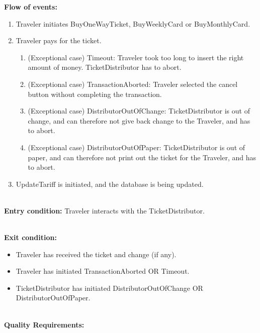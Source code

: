 \textbf{Flow of events:}
\begin{enumerate}
	\item Traveler initiates BuyOneWayTicket, BuyWeeklyCard or BuyMonthlyCard.
	\item Traveler pays for the ticket.
	\begin{enumerate}
		\item (Exceptional case) Timeout: Traveler took too long to insert the right amount of money. TicketDistributor has to abort.
		\item (Exceptional case) TransactionAborted: Traveler selected the cancel button without completing the transaction.
		\item (Exceptional case) DistributorOutOfChange: TicketDistributor is out of change, and can therefore not give back change to the Traveler, and has to abort.
		\item (Exceptional case) DistributorOutOfPaper: TicketDistributor is out of paper, and can therefore not print out the ticket for the Traveler, and has to abort.
	\end{enumerate}
	\item UpdateTariff is initiated, and the database is being updated.
\end{enumerate}

\HRule \\[0.4cm]

\textbf{Entry condition:} Traveler interacts with the TicketDistributor.

\HRule \\[0.4cm]

\textbf{Exit condition:}
\begin{itemize}
	\item Traveler has received the ticket and change (if any).
	\item Traveler has initiated TransactionAborted OR Timeout.
	\item TicketDistributor has initiated DistributorOutOfChange OR DistributorOutOfPaper.
\end{itemize}

\HRule \\[0.4cm]

\textbf{Quality Requirements:}

\HRule \\[0.4cm]
